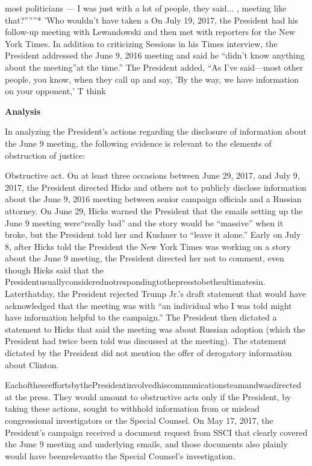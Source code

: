 most politicians — I was just with a lot of people, they said... , meeting like that?”””*
'Who wouldn't have taken a
On July 19, 2017, the President had his follow-up meeting with Lewandowski and then met with reporters for the New York Times.
In addition to criticizing Sessions in his Times interview, the President addressed the June 9, 2016 meeting and said he “didn't know anything about the meeting”at the time.”
The President added, “As I've said—most other people, you know, when they call up and say, 'By the way, we have information on your opponent,' T think

\begin{center}
\textbf{Analysis}
\end{center}

In analyzing the President's actions regarding the disclosure of information about the June 9 meeting, the following evidence is relevant to the elements of obstruction of justice:

Obstructive act.
On at least three occasions between June 29, 2017, and July 9, 2017, the President directed Hicks and others not to publicly disclose information about the June 9, 2016 meeting between senior campaign officials and a Russian attorney.
On June 29, Hicks warned the President that the emails setting up the June 9 meeting were“really bad” and the story would be “massive” when it broke, but the President told her and Kushner to “leave it alone.”
Early on July 8, after Hicks told the President the New York Times was working on a story about the June 9 meeting, the President directed her not to comment, even though Hicks said that the Presidentusuallyconsiderednotrespondingtothepresstobetheultimatesin.
Laterthatday, the President rejected Trump Jr.'s draft statement that would have acknowledged that the meeting was with “an individual who I was told might have information helpful to the campaign.” The President then dictated a statement to Hicks that said the meeting was about Russian adoption (which the President had twice been told was discussed at the meeting).
The statement dictated by the President did not mention the offer of derogatory information about Clinton.

EachoftheseeffortsbythePresidentinvolvedhiscommunicationsteamandwasdirected at the press.
They would amount to obstructive acts only if the President, by taking these actions, sought to withhold information from or mislead congressional investigators or the Special Counsel.
On May 17, 2017, the President's campaign received a document request from SSCI that clearly covered the June 9 meeting and underlying emails, and those documents also plainly would have beenrelevantto the Special Counsel's investigation.

